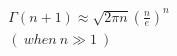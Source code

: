 \documentclass[preview]{standalone}
\begin{document}
\begin{align*}
\Gamma(n+1) \approx \sqrt{2\pi n}(\frac{n}{e})^n \\ ( \ when \ n \gg 1 \ )
\end{align*}
\end{document}
